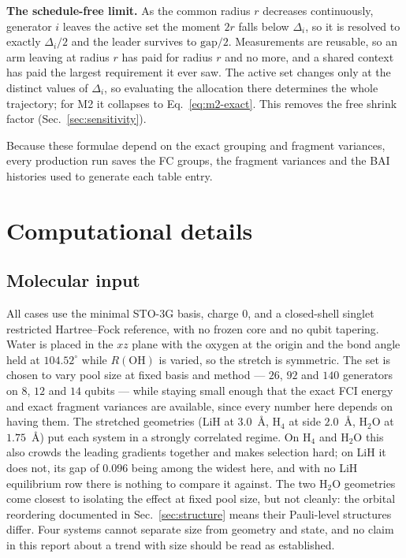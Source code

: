 \documentclass[10pt]{article}
\begin{document}
\textbf{The schedule-free limit.} As the common radius $r$ decreases continuously, generator $i$ leaves the active set the moment $2r$ falls below $\Delta_i$, so it is resolved to exactly $\Delta_i/2$ and the leader survives to $\mathrm{gap}/2$. Measurements are reusable, so an arm leaving at radius $r$ has paid for radius $r$ and no more, and a shared context has paid the largest requirement it ever saw. The active set changes only at the distinct values of $\Delta_i$, so evaluating the allocation there determines the whole trajectory; for M2 it collapses to Eq.~\eqref{eq:m2-exact}. This removes the free shrink factor (Sec.~\ref{sec:sensitivity}).

Because these formulae depend on the exact grouping and fragment variances, every production run saves the FC groups, the fragment variances and the BAI histories used to generate each table entry.

\section{Computational details}
\label{sec:computational}

\subsection{Molecular input}

All cases use the minimal STO-3G basis, charge $0$, and a closed-shell singlet restricted Hartree--Fock reference, with no frozen core and no qubit tapering. Water is placed in the $xz$ plane with the oxygen at the origin and the bond angle held at $104.52^\circ$ while $R(\mathrm{OH})$ is varied, so the stretch is symmetric. The set is chosen to vary pool size at fixed basis and method --- $26$, $92$ and $140$ generators on $8$, $12$ and $14$ qubits --- while staying small enough that the exact FCI energy and exact fragment variances are available, since every number here depends on having them. The stretched geometries (LiH at $3.0$~\si{\angstrom}, H$_4$ at side $2.0$~\si{\angstrom}, H$_2$O at $1.75$~\si{\angstrom}) put each system in a strongly correlated regime. On H$_4$ and H$_2$O this also crowds the leading gradients together and makes selection hard; on LiH it does not, its gap of $0.096$ being among the widest here, and with no LiH equilibrium row there is nothing to compare it against. The two H$_2$O geometries come closest to isolating the effect at fixed pool size, but not cleanly: the orbital reordering documented in Sec.~\ref{sec:structure} means their Pauli-level structures differ. Four systems cannot separate size from geometry and state, and no claim in this report about a trend with size should be read as established.
\end{document}
